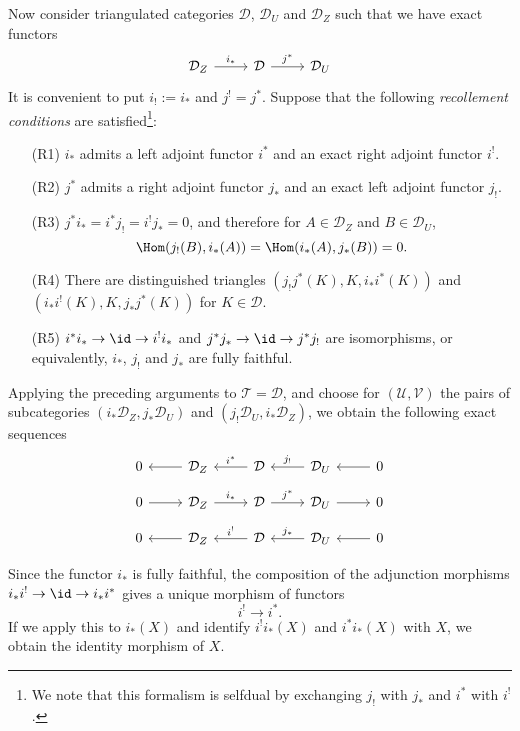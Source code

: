 Now consider triangulated categories $\mathcal{D}$, $\mathcal{D}_U$ and $\mathcal{D}_Z$ such that we have exact functors
\[\begin{tikzcd}
\mathcal{D}_Z\ar[r,"i_*"]&\mathcal{D}\ar[r,"j^*"]&\mathcal{D}_U
\end{tikzcd}\]
It is convenient to put $i_!:=i_*$ and $j^!=j^*$. Suppose that the following \textit{recollement conditions} are satisfied\footnote{We note that this formalism is selfdual by exchanging $j_!$ with $j_*$ and $i^*$ with $i^!$.}:
\begin{enumerate}[leftmargin=40pt]
    \item[(R1)] $i_*$ admits a left adjoint functor $i^*$ and an exact right adjoint functor $i^!$.
    \item[(R2)] $j^*$ admits a right adjoint functor $j_*$ and an exact left adjoint functor $j_!$.
    \item[(R3)] $j^*i_*=i^*j_!=i^!j_*=0$, and therefore for $A\in\mathcal{D}_Z$ and $B\in\mathcal{D}_U$,
    \[\Hom(j_!(B),i_*(A))=\Hom(i_*(A),j_*(B))=0.\]
    \item[(R4)] There are distinguished triangles $(j_!j^*(K),K,i_*i^*(K))$ and $(i_*i^!(K),K,j_*j^*(K))$ for $K\in\mathcal{D}$.
    \item[(R5)] $i^*i_*\to\id\to i^!i_*$ and $j^*j_*\to\id\to j^*j_!$ are isomorphisms, or equivalently, $i_*$, $j_!$ and $j_*$ are fully faithful. 
\end{enumerate}
Applying the preceding arguments to $\mathcal{T}=\mathcal{D}$, and choose for $(\mathcal{U},\mathcal{V})$ the pairs of subcategories $(i_*\mathcal{D}_Z,j_*\mathcal{D}_U)$ and $(j_!\mathcal{D}_U,i_*\mathcal{D}_Z)$, we obtain the following exact sequences
\[\begin{tikzcd}
0&\mathcal{D}_Z\ar[l]&\mathcal{D}\ar[l,swap,"i^*"]&\mathcal{D}_U\ar[l,swap,"j_!"]&0\ar[l]
\end{tikzcd}\]
\vspace*{-4mm}
\[\begin{tikzcd}
0\ar[r]&\mathcal{D}_Z\ar[r,"i_*"]&\mathcal{D}\ar[r,"j^*"]&\mathcal{D}_U\ar[r]&0
\end{tikzcd}\]
\vspace*{-4mm}
\[\begin{tikzcd}
0&\mathcal{D}_Z\ar[l]&\mathcal{D}\ar[l,swap,"i^!"]&\mathcal{D}_U\ar[l,swap,"j_*"]&0\ar[l]
\end{tikzcd}\]

Since the functor $i_*$ is fully faithful, the composition of the adjunction morphisms $i_*i^!\to\id\to i_*i^*$ gives a unique morphism of functors
\begin{equation}\label{triangle cat recollement i^! to i^* morphism}
i^!\to i^*.
\end{equation}
If we apply this to $i_*(X)$ and identify $i^!i_*(X)$ and $i^*i_*(X)$ with $X$, we obtain the identity morphism of $X$.\par

